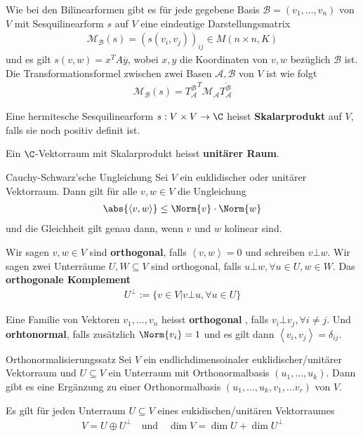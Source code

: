 Wie bei den Bilinearformen gibt es für jede gegebene Basis $\mathcal{B} = (v_{1}, \ldots, v_{n})$ von $V$ mit Sesquilinearform $s$ auf $V$ eine eindeutige Darstellungsmatrix 
\begin{align*}
    \mathcal{M}_{\mathcal{B}}(s) = \left(s(v_i,v_j)\right)_{ij} \in M(n\times n,K)
\end{align*}
und es gilt $s(v,w) = x^T A \overline{y}$, wobei $x,y$ die Koordinaten von $v,w$ bezüglich $\mathcal{B}$ ist. 
Die Transformationsformel zwischen zwei Basen $\mathcal{A}, \mathcal{B}$ von $V$ ist wie folgt
\begin{align*}
    \mathcal{M}_{\mathcal{B}}(s) = {T_{\mathcal{A}}^{\mathcal{B}}}^T \mathcal{M}_{\mathcal{A}} \overline{T_{\mathcal{A}}^{\mathcal{B}}}
\end{align*}

Eine hermitesche Sesquilinearform $s: V \times V \to \C$ heisst \textbf{Skalarprodukt} auf $V$, falls sie noch positiv definit ist.

Ein $\C$-Vektorraum mit Skalarprodukt heisst \textbf{unitärer Raum}.

\begin{satz}{Cauchy-Schwarz'sche Ungleichung}
    Sei $V$ ein euklidischer oder unitärer Vektorraum. Dann gilt für alle $v,w \in V$ die Ungleichung
    \begin{align*}
        \abs{\left<v,w\right>} \leq \Norm{v} \cdot \Norm{w}
    \end{align*}
    und die Gleichheit gilt genau dann, wenn $v$ und $w$ kolinear sind.
\end{satz}

Wir sagen $v,w \in V$ sind \textbf{orthogonal}, falls $\left<v,w\right> = 0$ und schreiben $v \bot w$. Wir sagen zwei Unterräume $U,W \subseteq V$ sind orthogonal, falls $u \bot w, \forall u \in U, w \in W$. Das \textbf{orthogonale Komplement}
\begin{align*}
    U^{\bot} := \{v \in V \big\vert v \bot u, \forall u \in U\}
\end{align*}

Eine Familie von Vektoren $v_{1}, \ldots, v_{n}$ heisst \textbf{orthogonal }, falls $v_i \bot v_j, \forall i\neq j$. Und \textbf{orhtonormal}, falls zusätzlich $\Norm{v_i} = 1$ und es gilt dann $\left<v_i,v_j\right> = \delta_{ij}$.

\begin{satz}{Orthonormalisierungssatz}
    Sei $V$ ein endlichdimensoinaler euklidischer/unitärer Vektorraum und $U \subseteq V$ ein Unterraum mit Orthonormalbasis $(u_{1}, \ldots, u_{k})$. Dann gibt es eine Ergänzung zu einer Orthonormalbasis $(u_{1}, \ldots, u_{k}, v_1, \ldots v_r)$ von $V$. 
\end{satz}
Es gilt für jeden Unterraum $U \subseteq V$ eines eukidischen/unitären Vektorraumes
\begin{align*}
    V = U \oplus U^{\bot} \quad \text{und} \quad \dim V = \dim U + \dim U^{\bot}
\end{align*}

